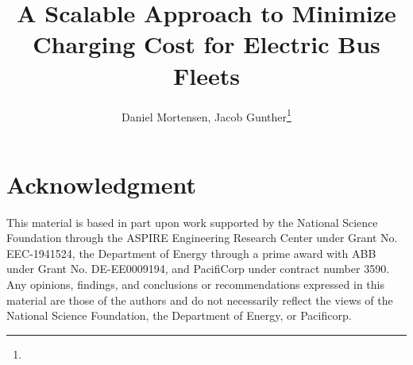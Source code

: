 \documentclass[lettersize,journal]{IEEEtran}
\begin{document}
 
\title{A Scalable Approach to Minimize Charging Cost for Electric Bus Fleets}
\author{Daniel Mortensen, Jacob Gunther\thanks{}}

%
{}

\maketitle 












\section*{Acknowledgment}This material is based in part upon work supported by the National Science Foundation through the ASPIRE Engineering Research Center under Grant No. EEC-1941524, the Department of Energy through a prime award with ABB under Grant No. DE-EE0009194, and PacifiCorp under contract number 3590. Any opinions, findings, and conclusions or recommendations expressed in this material are those of the authors and do not necessarily reflect the views of the National Science Foundation, the Department of Energy, or Pacificorp.

\printbibliography
\end{document}
